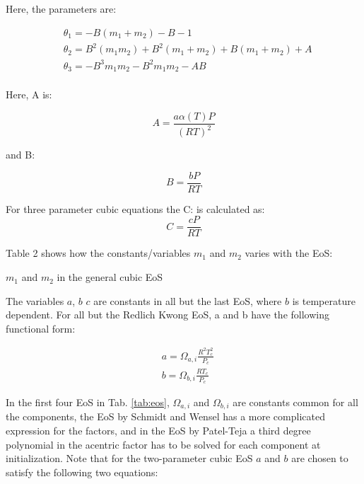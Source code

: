 \documentclass[a4paper, 12pt, english, sintefheadings, sintefcolour]{sintefmemo}
\begin{document}
Here, the parameters are:

\begin{equation}
\begin{split}
& \theta_1=-B\left(m_1+m_2\right)-B-1 \\
& \theta_2=B^2(m_1m_2)+B^2(m_1+m_2)+B(m_1+m_2)+A \\
& \theta_3= -B^3m_1m_2-B^2m_1m_2-AB \\
\end{split}
\end{equation}

Here, A is: 

\begin{equation}
A=\frac{a\alpha(T)P}{\left(RT\right)^2}
\end{equation}

and B:

\begin{equation}
B=\frac{bP}{RT}
\end{equation}

For three parameter cubic equations the C: is calculated as:
\begin{equation}
C=\frac{cP}{RT}
\end{equation}


Table 2 shows  how the constants/variables $m_1$ and $m_2$ varies with the EoS:

\begin{table}[htb]
\begin{minipage}[l]{0.58\linewidth}
\caption{$m_1$ and $m_2$ in the general cubic EoS}
\vspace{-3mm}

\label{tab:eos2}
\end{minipage}
\end{table}  

The variables $a$, $b$ $c$ are constants in all but the last EoS, where $b$ is
temperature dependent. For all but the Redlich Kwong EoS, a and b have the
following functional form:

\begin{equation}
\begin{split}
&a=\Omega_{a,i}\frac{R^2T_c^2}{P_c} \\
&b=\Omega_{b,i}\frac{RT_c}{P_c}
\end{split}
\end{equation} 



In the first four EoS in Tab. \ref{tab:eos}, $\Omega_{a,i}$ and $\Omega_{b,i}$
are constants common for all the components, the EoS by Schmidt and Wensel has
a more complicated expression for the factors, and in the EoS by Patel-Teja a
third degree polynomial in the acentric factor has to be solved for each
component at initialization. Note that for the two-parameter cubic EoS $a$ and
$b$ are chosen to satisfy the following two equations:
\end{document}
